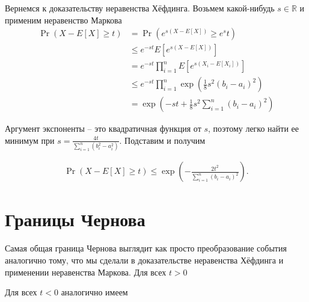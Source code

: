 \documentclass[12pt]{article}
\newcommand\R{\mathbb{R}}
\begin{document}
Вернемся к доказательству неравенства Хёфдинга. Возьмем какой-нибудь $s \in \R$ и применим неравенство Маркова
\begin{align*}
  \Pr(X - E[X] \ge t) &= \Pr(e^{s(X - E[X])} \ge e^st) \\
                      &\le e^{-st} E[e^{s(X - E[X])}] \\
                      &= e^{-st} \prod_{i = 1}^n E[e^{s(X_i - E[X_i])}] \\
                      &\le e^{-st} \prod_{i = 1}^n \exp\left(\frac{1}{8}s^2(b_i - a_i)^2\right) \\
                      &= \exp\left(-st + \frac{1}{8}s^2 \sum_{i = 1}^n (b_i - a_i)^2\right)
\end{align*}

Аргумент экспоненты -- это квадратичная функция от $s$, поэтому легко найти ее минимум при $s = \frac{4t}{\sum_{i = 1}^n (b_i^2 - a_i^2)}$. Подставим и получим

\begin{align*}
  \Pr(X - E[X] \ge t) \le \exp\left(-\frac{2t^2}{\sum_{i = 1}^n (b_i - a_i)^2}\right).
\end{align*}

\section{Границы Чернова}

Самая общая граница Чернова выглядит как просто преобразование события аналогично тому, что мы сделали в доказательстве неравенства Хёфдинга и применении неравенства Маркова. Для всех $t > 0$
\begin{center}
\end{center}

Для всех $t < 0$ аналогично имеем
\begin{center}
\end{center}
\end{document}
